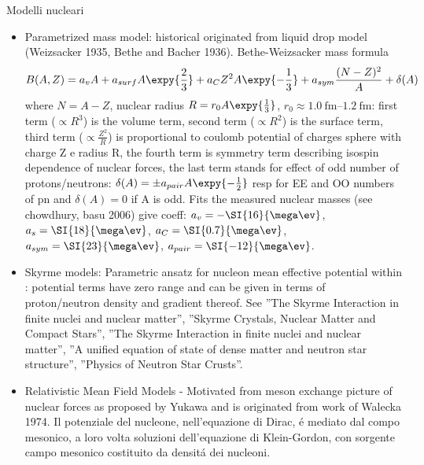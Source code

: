 \begin{frame}{Modelli nucleari}
    \begin{itemize}
        \item Parametrized mass model: historical originated from liquid drop model (Weizsacker 1935, Bethe and Bacher 1936). Bethe-Weizsacker mass formula
            \begin{equation*}
                B(A,Z)=a_vA+a_{surf}A\expy{\frac{2}{3}}+a_CZ^2A\expy{-\frac{1}{3}}+a_{sym}\frac{(N-Z)^2}{A}+\delta(A)
            \end{equation*}
            where $N=A-Z$, nuclear radius $R=r_0A\expy{\frac{1}{3}}$, $r_0\approx\SIrange{1.0}{1.2}{\femto\meter}$: first term ($\propto R^3$) is the volume term, second term ($\propto R^2$) is the surface term, third term ($\propto \frac{Z^2}{R}$) is proportional to coulomb potential of charges sphere with charge Z e radius R, the fourth term is symmetry term describing isospin dependence of nuclear forces, the last term stands for effect of odd number of protons/neutrons: $\delta(A)=\pm a_{pair}A\expy{-\frac{1}{2}}$ resp for EE and OO numbers of pn and $\delta(A)=0$ if A is odd. Fits the measured nuclear masses (see chowdhury, basu 2006) give coeff: $a_v=-\SI{16}{\mega\ev}$, $a_s=\SI{18}{\mega\ev}$, $a_C=\SI{0.7}{\mega\ev}$, $a_{sym}=\SI{23}{\mega\ev}$, $a_{pair}=\SI{-12}{\mega\ev}$.
        \item Skyrme models: Parametric ansatz for nucleon mean effective potential within \schr{}: potential terms have zero range and can be given in terms of proton/neutron density and gradient thereof. See ''The Skyrme Interaction in finite nuclei and nuclear matter'', ''Skyrme Crystals, Nuclear Matter and Compact Stars'', ''The Skyrme Interaction in finite nuclei and nuclear matter'', ''A unified equation of state of dense matter and neutron star structure'', ''Physics of Neutron Star Crusts''.
        \item Relativistic Mean Field Models - Motivated from meson exchange picture of nuclear forces as proposed by Yukawa and is originated from work of Walecka 1974. Il potenziale del nucleone, nell'equazione di Dirac, \'e mediato dal compo mesonico, a loro volta soluzioni dell'equazione di Klein-Gordon, con sorgente campo mesonico costituito da densit\'a dei nucleoni.
    \end{itemize}
\end{frame}

